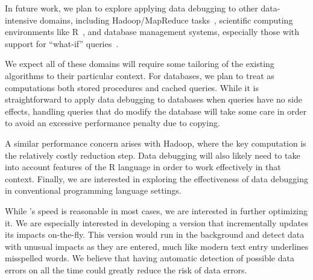 In future work, we plan to explore applying data debugging to other
data-intensive domains, including Hadoop/MapReduce
tasks~\cite{dean2008mapreduce,hadoop}, scientific computing
environments like R~\cite{ihaka1996r}, and database management
systems, especially those with support for ``what-if''
queries~\cite{Balmin:2000:HQO:645926.672016}.

We expect all of these domains will require some tailoring of the
existing algorithms to their particular context. For databases, we
plan to treat as computations both stored procedures and cached
queries. While it is straightforward to apply data debugging to
databases when queries have no side effects, handling queries that do
modify the database will take some care in order to avoid an excessive
performance penalty due to copying.

A similar performance concern arises with Hadoop, where the key
computation is the relatively costly reduction step. Data debugging
will also likely need to take into account features of the R language
in order to work effectively in that context. Finally, we are
interested in exploring the effectiveness of data debugging in
conventional programming language settings.


While \checkcell{}'s speed is reasonable in most cases, we are
interested in further optimizing it. We are especially interested in
developing a version that incrementally updates its impacts
on-the-fly. This version would run in the background and detect 
data with unusual impacts as they are entered, much like modern text entry
underlines misspelled words. We believe that having automatic
detection of possible data errors on all the time could greatly reduce the
risk of data errors.
